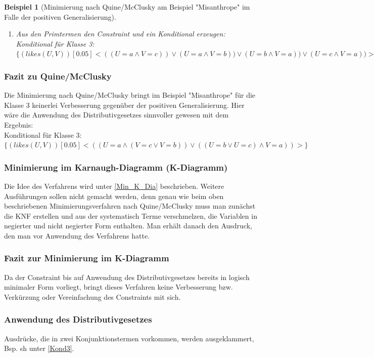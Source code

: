 \documentclass[a4paper, 11pt]{book}
\newtheorem{Bsp}{Beispiel}[section]
\begin{document}
{\begin{Bsp}[Minimierung nach Quine/McClusky am Beispiel "{}Misanthrope"{} im Falle der positiven Generalisierung]
\begin{enumerate}
\begin{enumerate}
			\item Zeilendominanzprüfung: keine Verbesserung
		\end{enumerate}
		\item Aus den Primtermen den Constraint und ein Konditional erzeugen:\\
			Konditional für Klasse 3: $ \{(likes(U,V))[0.05] <((U = a \land V = c)) \lor (U = a \land V = b)) \lor (U = b \land V = a)) \lor (U = c \land V = a))>\} $\\
		\end{enumerate}
	\end{Bsp}
		\subsubsection{Fazit zu Quine/McClusky}
		Die Minimierung nach Quine/McClusky bringt im Beispiel "{}Misanthrope"{} für die Klasse 3 keinerlei Verbesserung gegenüber der positiven Generalisierung. Hier wäre die Anwendung des Distributivgesetzes sinnvoller gewesen mit dem Ergebnis:\\
		Konditional für Klasse 3: $ \{(likes(U,V))[0.05] <((U = a \land (V = c \lor V = b)) \lor ((U = b \lor U = c) \land V = a))>\} $ \label{Kond3}
		\subsubsection{Minimierung im Karnaugh-Diagramm (K-Diagramm)}  \label{Min_Besch_K} 
		Die Idee des Verfahrens wird unter \ref{Min_K_Dia} beschrieben. Weitere Ausführungen sollen nicht gemacht werden, denn genau wie beim oben beschriebenen Minimierungsverfahren nach Quine/McClusky muss man zunächst die KNF erstellen und aus der systematisch Terme verschmelzen, die Variablen in negierter und nicht negierter Form enthalten. Man erhält danach den Ausdruck, den man vor Anwendung des Verfahrens hatte.
		\subsubsection{Fazit zur Minimierung im K-Diagramm}
		Da der Constraint bis auf Anwendung des Distributivgesetzes bereits in logisch minimaler Form vorliegt, bringt dieses Verfahren keine Verbesserung bzw. Verkürzung oder Vereinfachung des Constraints mit sich.
		\subsubsection{Anwendung des Distributivgesetzes}
		Ausdrücke, die in zwei Konjunktionstermen vorkommen, werden ausgeklammert, Bsp. sh unter \ref{Kond3}.
}
\end{document}
